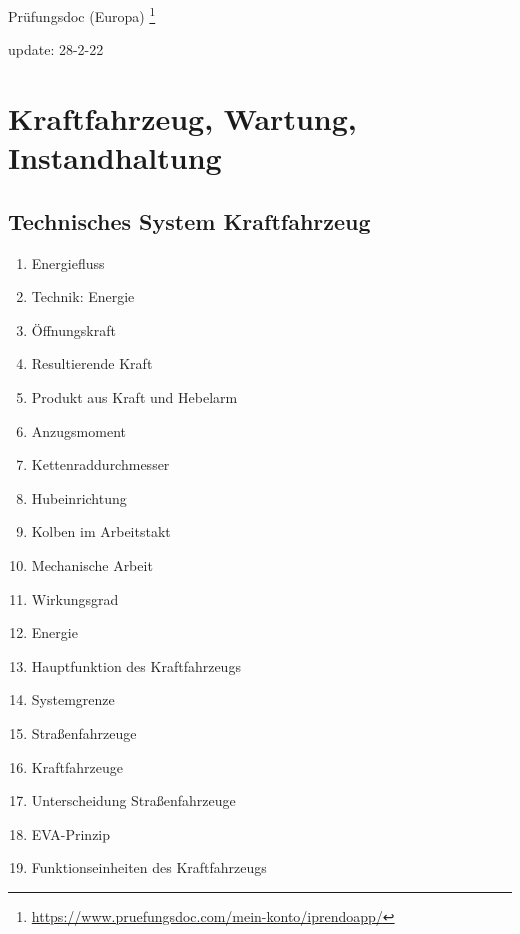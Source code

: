 Prüfungsdoc (Europa) \footnote{\url{https://www.pruefungsdoc.com/mein-konto/iprendoapp/}}

update: 28-2-22

\section{Kraftfahrzeug, Wartung,
Instandhaltung}\label{kraftfahrzeug-wartung-instandhaltung}

\subsection{Technisches System
Kraftfahrzeug}\label{technisches-system-kraftfahrzeug}

\begin{enumerate}
\item
  Energiefluss\\
\item
  Technik: Energie\\
\item
  Öffnungskraft\\
\item
  Resultierende Kraft\\
\item
  Produkt aus Kraft und Hebelarm\\
\item
  Anzugsmoment\\
\item
  Kettenraddurchmesser\\
\item
  Hubeinrichtung\\
\item
  Kolben im Arbeitstakt\\
\item
  Mechanische Arbeit\\
\item
  Wirkungsgrad\\
\item
  Energie\\
\item
  Hauptfunktion des Kraftfahrzeugs\\
\item
  Systemgrenze\\
\item
  Straßenfahrzeuge\\
\item
  Kraftfahrzeuge\\
\item
  Unterscheidung Straßenfahrzeuge\\
\item
  EVA-Prinzip\\
\item
  Funktionseinheiten des Kraftfahrzeugs
\end{enumerate}


